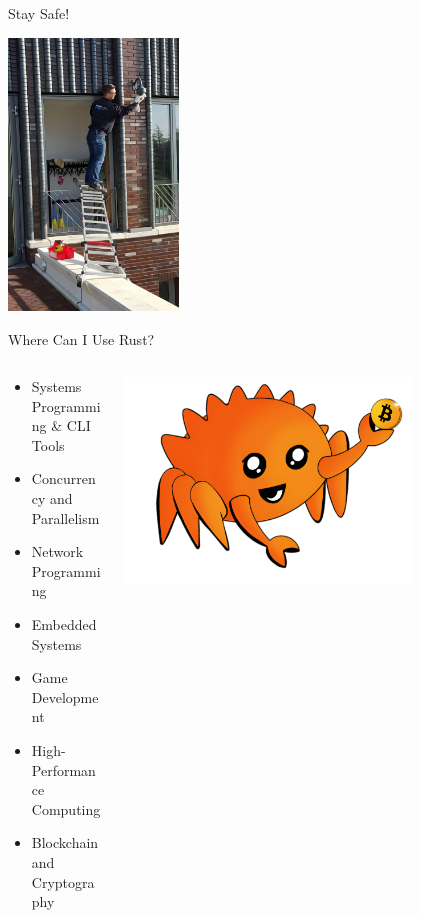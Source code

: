 \documentclass[10pt,aspectratio=169]{beamer}
\begin{document}
\begin{frame}{Stay Safe!}
    \begin{center}
        \includegraphics[width=0.34\textwidth]{img/unsafe_work.jpeg}
    \end{center}    
\end{frame}

\begin{frame}{Where Can I Use Rust?}

\begin{columns}
\begin{column}{0.6\textwidth}
    \begin{itemize}
    \item Systems Programming \& CLI Tools
    \item Concurrency and Parallelism
    \item Network Programming
    \item Embedded Systems
    \item Game Development
    \item High-Performance Computing
    \item Blockchain and Cryptography    
\end{itemize}
\end{column}
\begin{column}{0.4\textwidth}  %
    \begin{center}
     \includegraphics[width=0.75\textwidth]{img/mascot.png}
     \end{center}
\end{column}
\end{columns}
\end{frame}
\end{document}

